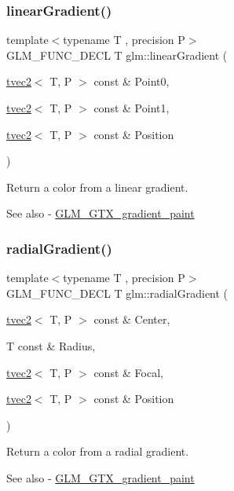 \subsubsection{\texorpdfstring{linear\+Gradient()}{linearGradient()}}
{\footnotesize\ttfamily template$<$typename T , precision P$>$ \\
G\+L\+M\+\_\+\+F\+U\+N\+C\+\_\+\+D\+E\+CL T glm\+::linear\+Gradient (\begin{DoxyParamCaption}\item[{\hyperlink{structglm_1_1tvec2}{tvec2}$<$ T, P $>$ const \&}]{Point0,  }\item[{\hyperlink{structglm_1_1tvec2}{tvec2}$<$ T, P $>$ const \&}]{Point1,  }\item[{\hyperlink{structglm_1_1tvec2}{tvec2}$<$ T, P $>$ const \&}]{Position }\end{DoxyParamCaption})}

Return a color from a linear gradient. \begin{DoxySeeAlso}{See also}
-\/ \hyperlink{group__gtx__gradient__paint}{G\+L\+M\+\_\+\+G\+T\+X\+\_\+gradient\+\_\+paint} 
\end{DoxySeeAlso}
\mbox{\label{group__gtx__gradient__paint_ga166d43d567a4cf150579a92f69b0dc9f}} 
\subsubsection{\texorpdfstring{radial\+Gradient()}{radialGradient()}}
{\footnotesize\ttfamily template$<$typename T , precision P$>$ \\
G\+L\+M\+\_\+\+F\+U\+N\+C\+\_\+\+D\+E\+CL T glm\+::radial\+Gradient (\begin{DoxyParamCaption}\item[{\hyperlink{structglm_1_1tvec2}{tvec2}$<$ T, P $>$ const \&}]{Center,  }\item[{T const \&}]{Radius,  }\item[{\hyperlink{structglm_1_1tvec2}{tvec2}$<$ T, P $>$ const \&}]{Focal,  }\item[{\hyperlink{structglm_1_1tvec2}{tvec2}$<$ T, P $>$ const \&}]{Position }\end{DoxyParamCaption})}

Return a color from a radial gradient. \begin{DoxySeeAlso}{See also}
-\/ \hyperlink{group__gtx__gradient__paint}{G\+L\+M\+\_\+\+G\+T\+X\+\_\+gradient\+\_\+paint} 
\end{DoxySeeAlso}

